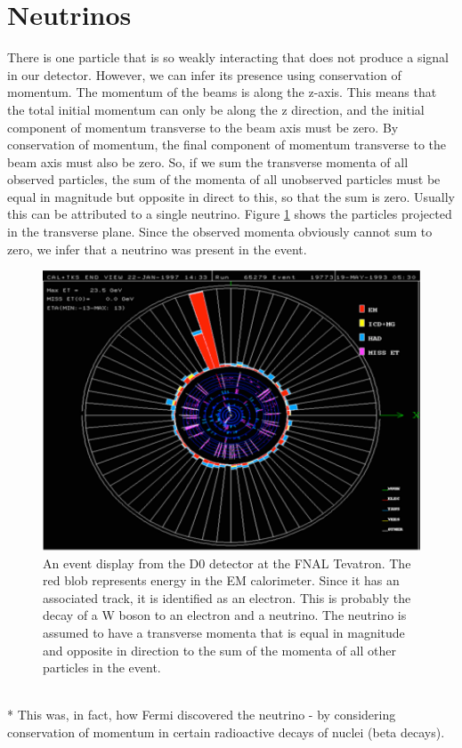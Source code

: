 \section{Neutrinos}
There is one particle that is so weakly interacting that does not produce a signal in our detector. However, we can infer its presence using conservation of momentum. The momentum of the beams is along the z-axis. This means that the total initial momentum can only be along the z direction, and the initial component of momentum transverse to the beam axis must be zero. By conservation of momentum, the final component of momentum transverse to the beam axis must also be zero.  So, if we sum the transverse momenta of all observed particles, the sum of the momenta of all unobserved particles must be equal in magnitude but opposite in direct to this, so that the sum is zero.  Usually this can be attributed to a single neutrino. Figure \ref{fig:pid4} shows the particles projected in the transverse plane. Since the observed momenta obviously cannot sum to zero, we infer that a neutrino was present in the event.
\begin{figure}[h]
\centering\includegraphics[scale=0.4]{./particleID/Pictures/fig4.pdf}
\caption{\small An event display from the D0 detector at the FNAL Tevatron. The red blob represents energy in the EM calorimeter. Since it has an associated track, it is identified as an electron. This is probably the decay of a W boson to an electron and a neutrino. The neutrino is assumed to have a transverse momenta that is equal in magnitude and opposite in direction to the sum of the momenta of all other particles in the event.}
\label{fig:pid4}
\end{figure}
\\*
This was, in fact, how Fermi discovered the neutrino - by considering conservation of momentum in certain radioactive decays of nuclei (beta decays). 

